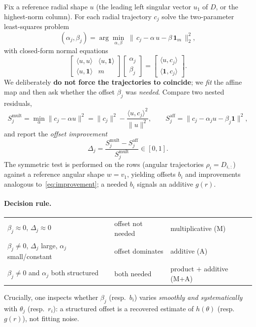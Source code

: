 \documentclass{article}
\begin{document}
Fix a reference radial shape $u$ (the leading left singular vector $u_{1}$ of
$D$, or the highest-norm column). For each radial trajectory $c_{j}$ solve the
two-parameter least-squares problem
\begin{equation}
(\alpha_{j},\beta_{j})
=\arg\min_{\alpha,\beta}\;
\bigl\|\,c_{j}-\alpha\,u-\beta\,\mathbf 1_{m}\,\bigr\|_{2}^{2},
\label{eq:affine}
\end{equation}
with closed-form normal equations
\begin{equation}
\begin{bmatrix}
\langle u,u\rangle & \langle u,\mathbf 1\rangle\\[2pt]
\langle u,\mathbf 1\rangle & m
\end{bmatrix}
\begin{bmatrix}\alpha_{j}\\[2pt]\beta_{j}\end{bmatrix}
=
\begin{bmatrix}\langle u,c_{j}\rangle\\[2pt]\langle\mathbf 1,c_{j}\rangle\end{bmatrix}.
\end{equation}
We deliberately \textbf{do not force the trajectories to coincide}; we
\emph{fit} the affine map and then ask whether the offset $\beta_{j}$ was
\emph{needed}. Compare two nested residuals,
\begin{equation}
S^{\mathrm{mult}}_{j}=\min_{\alpha}\|c_{j}-\alpha u\|^{2}
=\|c_{j}\|^{2}-\frac{\langle u,c_{j}\rangle^{2}}{\|u\|^{2}},
\qquad
S^{\mathrm{aff}}_{j}=\bigl\|c_{j}-\alpha_{j}u-\beta_{j}\mathbf 1\bigr\|^{2},
\end{equation}
and report the \emph{offset improvement}
\begin{equation}
\Delta_{j}=\frac{S^{\mathrm{mult}}_{j}-S^{\mathrm{aff}}_{j}}
{S^{\mathrm{mult}}_{j}}\in[0,1].
\label{eq:improvement}
\end{equation}
The symmetric test is performed on the rows (angular trajectories
$\rho_{i}=D_{i,:}$) against a reference angular shape $w=v_{1}$, yielding
offsets $b_{i}$ and improvements analogous to~\eqref{eq:improvement}; a needed
$b_{i}$ signals an additive $g(r)$.

\paragraph{Decision rule.}
\begin{center}
\begin{tabular}{l l l}
\hline
$\beta_{j}\approx0$, $\Delta_{j}\approx0$ & offset not needed & multiplicative (M) \\
$\beta_{j}\neq0$, $\Delta_{j}$ large, $\alpha_{j}$ small/constant & offset dominates & additive (A) \\
$\beta_{j}\neq0$ and $\alpha_{j}$ both structured & both needed & product $+$ additive (M+A) \\
\hline
\end{tabular}
\end{center}
Crucially, one inspects whether $\beta_{j}$ (resp.\ $b_{i}$) varies
\emph{smoothly and systematically} with $\theta_{j}$ (resp.\ $r_{i}$): a
structured offset is a recovered estimate of $h(\theta)$ (resp.\ $g(r)$),
not fitting noise.
\end{document}
